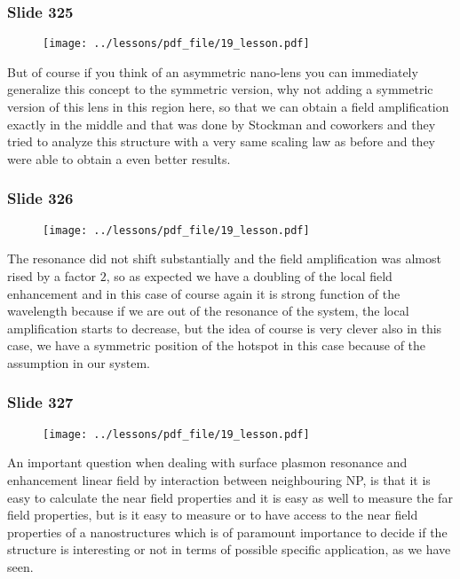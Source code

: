 \documentclass[../main/main.tex]{subfiles}
\begin{document}
\newpage

\subsubsection{Slide 325}

\begin{figure}[h!]
\centering
\texttt{[image: ../lessons/pdf\_file/19\_lesson.pdf]}
\end{figure}

But of course if you think of an asymmetric nano-lens you can immediately generalize this concept to the symmetric version, why not adding a symmetric version of this lens in this region here, so that we can obtain a field amplification exactly in the middle and that was done by Stockman and coworkers and they tried to analyze this structure with a very same scaling law as before and they were able to obtain a even better results.

\newpage

\subsubsection{Slide 326}

\begin{figure}[h!]
\centering
\texttt{[image: ../lessons/pdf\_file/19\_lesson.pdf]}
\end{figure}

The resonance did not shift substantially and the field amplification was almost rised by a factor $2$, so as expected we have a doubling of the local field enhancement and in this case of course again it is strong function of the wavelength because if we are out of the resonance of the system, the local amplification starts to decrease, but the idea of course is very clever also in this case, we have a symmetric position of the hotspot in this case because of the assumption in our system.

\newpage

\subsubsection{Slide 327}

\begin{figure}[h!]
\centering
\texttt{[image: ../lessons/pdf\_file/19\_lesson.pdf]}
\end{figure}

An important question when dealing with surface plasmon resonance and enhancement linear field by interaction between neighbouring NP, is that it is easy to calculate the near field properties and it is easy as well to measure the far field properties, but  is it easy to measure or to have access to the near field properties of a nanostructures which is of paramount importance to decide if the structure is interesting or not in terms of possible specific application, as we have seen.
\end{document}
